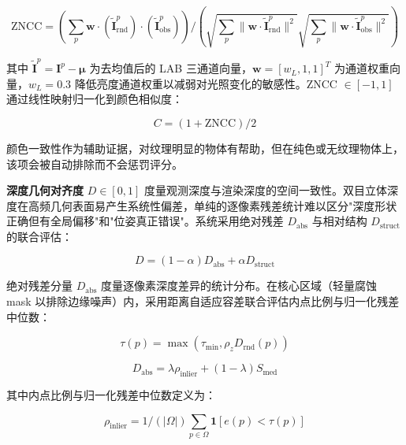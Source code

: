 \documentclass[review]{vgtc}
\begin{document}
\begin{equation}
\mathrm{ZNCC} = (\sum_{p} \mathbf{w} \cdot (\widetilde{\mathbf{I}}_{\mathrm{rnd}}^p) \cdot (\widetilde{\mathbf{I}}_{\mathrm{obs}}^p)) / (\sqrt{\sum_{p} \lVert \mathbf{w} \cdot \widetilde{\mathbf{I}}_{\mathrm{rnd}}^p \rVert^2} \sqrt{\sum_{p} \lVert \mathbf{w} \cdot \widetilde{\mathbf{I}}_{\mathrm{obs}}^p \rVert^2})
\label{eq:zncc}
\end{equation}


其中 $\widetilde{\mathbf{I}}^p = \mathbf{I}^p - \mathbf{\mu}$ 为去均值后的 LAB 三通道向量，$\mathbf{w} = [w_L, 1, 1]^T$ 为通道权重向量，$w_L = 0.3$ 降低亮度通道权重以减弱对光照变化的敏感性。ZNCC $\in [-1,1]$ 通过线性映射归一化到颜色相似度：

\begin{equation}
C = (1 + \mathrm{ZNCC}) / 2
\label{eq:color-sim}
\end{equation}


颜色一致性作为辅助证据，对纹理明显的物体有帮助，但在纯色或无纹理物体上，该项会被自动排除而不会惩罚评分。

\textbf{深度几何对齐度} $D \in [0,1]$ 度量观测深度与渲染深度的空间一致性。双目立体深度在高频几何表面易产生系统性偏差，单纯的逐像素残差统计难以区分"深度形状正确但有全局偏移"和"位姿真正错误"。系统采用绝对残差 $D_{\mathrm{abs}}$ 与相对结构 $D_{\mathrm{struct}}$ 的联合评估：

\begin{equation}
D = (1-\alpha) D_{\mathrm{abs}} + \alpha D_{\mathrm{struct}}
\label{eq:depth-joint}
\end{equation}


绝对残差分量 $D_{\mathrm{abs}}$ 度量逐像素深度差异的统计分布。在核心区域（轻量腐蚀 mask 以排除边缘噪声）内，采用距离自适应容差联合评估内点比例与归一化残差中位数：

\begin{equation}
\tau(p) = \max\!\left(\tau_{\mathrm{min}}, \rho_z D_{\mathrm{rnd}}(p)\right)
\label{eq:depth-thresh}
\end{equation}


\begin{equation}
D_{\mathrm{abs}} = \lambda \rho_{\mathrm{inlier}} + (1-\lambda) S_{\mathrm{med}}
\label{eq:depth-abs}
\end{equation}


其中内点比例与归一化残差中位数定义为：

\begin{equation}
\rho_{\mathrm{inlier}} = 1/(\lvert \Omega \rvert) \sum_{p \in \Omega} \mathbf{1}[e(p) < \tau(p)]
\end{equation}
\end{document}
